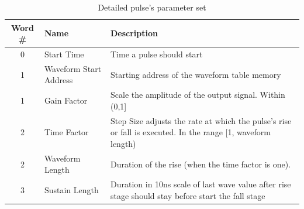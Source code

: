 \begin{table}[htbp]
    \centering
    \begin{tabularx}{\textwidth}{|c|X|X|}
        \hline
        Word \# & Name & Description \\
        \hline
        0 & Start Time & Time a pulse should start \\
        \hline
        1 & Waveform Start Address & Starting address of the waveform table memory \\
        \hline
        1 & Gain Factor & Scale the amplitude of the output signal. Within (0,1] \\
        \hline
        2 & Time Factor & Step Size adjusts the rate at which the pulse's rise or fall is executed. In the range [1, waveform length) \\
        \hline
        2 & Waveform Length & Duration of the rise (when the time factor is one). \\
        \hline
        3 & Sustain Length & Duration in 10ns scale of last wave value after rise stage should stay before start the fall stage \\
        \hline
    \end{tabularx}
    \caption{Detailed pulse's parameter set}
    \label{tab:pd_param}
\end{table}



